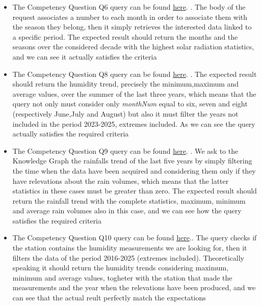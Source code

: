 \begin{itemize}
	\item The Competency Question Q6 query can be found \href{https://github.com/zerise000/KG_Project2025_ClimateChange/blob/main/Evaluation/competencyQuestions/Q6.txt}{here}.
.
	The body of the request associates a number to each month
	in order to associate them with the season they belong, then
	it simply retrieves the interested data linked to a specific
	period. The expected result should return the months and the seasons over the
	considered decade with the highest solar radiation statistics,
	and we can see it actually satisfies the criteria

	\item The Competency Question Q8 query can be found \href{https://github.com/zerise000/KG_Project2025_ClimateChange/blob/main/Evaluation/competencyQuestions/Q8.txt}{here}.
.
	The expected result should return the humidity trend, 
	precisely the minimum,maximum and average values, over the
	summer of the last three years, which means that the query not
	only must consider only \textit{monthNum} equal to six, seven
	and eight (respectively June,July and August) but also it must filter
	the years not included in the period 2023-2025, extremes included.
	As we can see the query actually satisfies the required criteria

	\item The Competency Question Q9 query can be found \href{https://github.com/zerise000/KG_Project2025_ClimateChange/blob/main/Evaluation/competencyQuestions/Q9.txt}{here}.
. 
	We ask to the Knowledge Graph the rainfalls trend of the last
	five years by simply filtering the time when the data
	have been acquired and considering them only if they have
	relevations about the rain volumes, which means that the latter
	statistics in these cases must be greater than zero. The expected
	result should return the rainfall trend with the complete statistics,
	maximum, minimum and average rain volumes also in this case, and we
	can see how the query satisfies the required criteria

	\item The Competency Question Q10 query can be found \href{https://github.com/zerise000/KG_Project2025_ClimateChange/blob/main/Evaluation/competencyQuestions/Q10.txt}{here}..
	The query checks if the station contains the humidity measurements
	we are looking for, then it filters the data of the period
	2016-2025 (extremes included). Theoretically speaking it should
	return the humidity trends considering maximum, minimum and
	average values, togheter with the station that made the measurements
	and the year when the relevations have been produced, and we can see
	that the actual reult perfectly match the expectations
\end{itemize}
